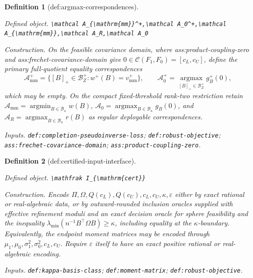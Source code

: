 \documentclass{article}
\newtheorem{definition}{Definition}
\begin{document}
\begin{definition}[def:argmax-correspondences]\label{def:argmax-correspondences}
\par\smallskip\noindent\emph{Defined object.} \texttt{\textbackslash{}\allowbreak{}mathcal A\_\allowbreak{}\{\textbackslash{}\allowbreak{}mathrm\{mm\}\allowbreak{}\}\allowbreak{}\textasciicircum{}+\allowbreak{},\allowbreak{}\textbackslash{}\allowbreak{}mathcal A\_\allowbreak{}0\textasciicircum{}+\allowbreak{},\allowbreak{}\textbackslash{}\allowbreak{}mathcal A\_\allowbreak{}\{\textbackslash{}\allowbreak{}mathrm\{mm\}\allowbreak{}\}\allowbreak{},\allowbreak{}\textbackslash{}\allowbreak{}mathcal A\_\allowbreak{}R,\allowbreak{}\textbackslash{}\allowbreak{}mathcal A\_\allowbreak{}0}
\par\smallskip\noindent\emph{Construction.} On the feasible covariance domain, where ass:product-coupling-zero and ass:frechet-covariance-domain give \(0\in\mathcal C(F_1,F_0)=[c_L,c_U]\), define the primary full-quotient equality correspondences
\[
\mathcal A_{\mathrm{mm}}^+=\{[B]_+\in\mathcal B_Z^+:w^+(B)=v_{\mathrm{mm}}^+\},
\qquad
\mathcal A_0^+=\operatorname*{argmax}_{[B]_+\in\mathcal B_Z^+}g_B^+(0),
\]
which may be empty.  On the compact fixed-threshold rank-two restriction retain \(\mathcal A_{\mathrm{mm}}=\operatorname*{argmin}_{B\in\mathcal B_\kappa}w(B)\), \(\mathcal A_0=\operatorname*{argmax}_{B\in\mathcal B_\kappa}g_B(0)\), and \(\mathcal A_R=\operatorname*{argmax}_{B\in\mathcal B_\kappa}r(B)\) as regular deployable correspondences.
\par\smallskip\noindent\emph{Inputs.} \texttt{def:\allowbreak{}completion-\allowbreak{}pseudoinverse-\allowbreak{}loss}; \texttt{def:\allowbreak{}robust-\allowbreak{}objective}; \texttt{ass:\allowbreak{}frechet-\allowbreak{}covariance-\allowbreak{}domain}; \texttt{ass:\allowbreak{}product-\allowbreak{}coupling-\allowbreak{}zero}.
\end{definition}

\begin{definition}[def:certified-input-interface]\label{def:certified-input-interface}
\par\smallskip\noindent\emph{Defined object.} \texttt{\textbackslash{}\allowbreak{}mathfrak I\_\allowbreak{}\{\textbackslash{}\allowbreak{}mathrm\{cert\}\allowbreak{}\}\allowbreak{}}
\par\smallskip\noindent\emph{Construction.} Encode \(\Pi,\Omega,Q(c_L),Q(c_U),c_L,c_U,\kappa,\varepsilon\) either by exact rational or real-algebraic data, or by outward-rounded inclusion oracles supplied with effective refinement moduli and an exact decision oracle for sphere feasibility and the inequality \(\lambda_{\min}(n^{-1}B^{\top}\Omega B)\ge\kappa\), including equality at the \(\kappa\)-boundary.  Equivalently, the endpoint moment matrices may be encoded through \(\mu_1,\mu_0,\sigma_1^2,\sigma_0^2,c_L,c_U\).  Require \(\varepsilon\) itself to have an exact positive rational or real-algebraic encoding.
\par\smallskip\noindent\emph{Inputs.} \texttt{def:\allowbreak{}kappa-\allowbreak{}basis-\allowbreak{}class}; \texttt{def:\allowbreak{}moment-\allowbreak{}matrix}; \texttt{def:\allowbreak{}robust-\allowbreak{}objective}.
\end{definition}
\end{document}

